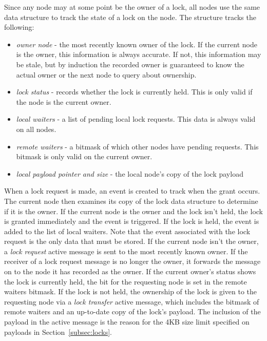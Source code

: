 Since any node may at some point be the owner of a lock, all nodes use the same data structure to track the
state of a lock on the node.
The structure tracks the following:
\begin{itemize} \itemsep1pt \parskip0pt 
\item {\em owner node} - the most recently known owner of the lock.  If the current node is the owner, this
information is always accurate.  If not, this information may be stale, but by induction the recorded 
owner is guaranteed to know the actual owner or the next node to query about ownership.
\item {\em lock status} - records whether the lock is currently held.  This is only valid if the node
is the current owner.
\item {\em local waiters} - a list of pending local lock requests.  This data is always valid on all nodes.
\item {\em remote waiters} - a bitmask of which other nodes have pending requests.  This bitmask is only
valid on the current owner.
\item {\em local payload pointer and size} - the local node's copy of the lock payload
\end{itemize}

When a lock request is made, an event is created to track when the grant occurs.  The current node then
examines its copy of the lock data structure to determine if it is the owner.
If the current node is the owner and the lock isn't
held, the lock is granted immediately and the event is triggered.  If the lock is held, the event is added
to the list of local waiters.  Note that the event associated with
the lock request is the only data that must be stored.
If the current node isn't the owner, a {\em lock request} active message is
sent to the most recently known owner.  If the receiver of a lock request message is no
longer the owner, it forwards the message on to the node it has recorded as the owner.
If the current owner's status shows
the lock is currently held, the bit for the requesting node is set in the remote waiters bitmask.  If the lock is
not held, the ownership of the lock is given to the requesting node via a {\em lock transfer} active
message, which includes the bitmask of remote waiters and an up-to-date copy 
of the lock's payload.  The inclusion of the payload in the active message is the reason for the 
4KB size limit specified on payloads in Section~\ref{subsec:locks}.

